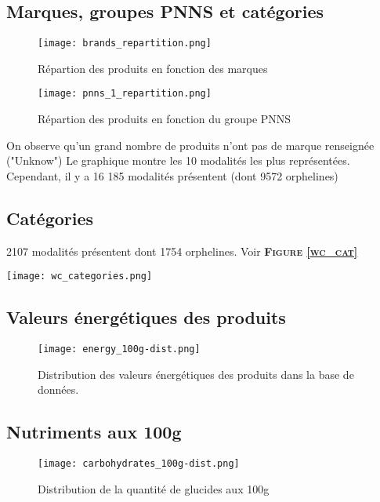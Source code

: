   \subsection{Marques, groupes PNNS et catégories}
  \begin{figure}[H]
    \texttt{[image: brands\_repartition.png]}
    \caption{Répartion des produits en fonction des marques}
    \label{}
  \end{figure}
  \begin{figure}[H]
    \texttt{[image: pnns\_1\_repartition.png]}
    \caption{Répartion des produits en fonction du groupe PNNS}
    \label{}
  \end{figure}

  On observe qu'un grand nombre de produits n'ont pas de marque renseignée ("Unknow")
  Le graphique montre les 10 modalités les plus représentées. Cependant, il y a
  16 185 modalités présentent (dont 9572 orphelines)

  \subsection{Catégories}
  2107 modalités présentent dont 1754 orphelines. Voir \textsc{\bf{Figure \ref{wc_cat}}}
  \begin{figure*}
    \texttt{[image: wc\_categories.png]}
    \caption{Les catégories présentent dans la base de données sous forme de
    nuage de mot (wordcloud)}
    \label{wc_cat}
  \end{figure*}


  \subsection{Valeurs énergétiques des produits}
  \begin{figure}[H]
    \texttt{[image: energy\_100g-dist.png]}
    \caption{Distribution des valeurs énergétiques des produits dans la base
    de données.}
    \label{}
  \end{figure}

  \subsection{Nutriments aux 100g}
  \begin{figure}[H]
    \texttt{[image: carbohydrates\_100g-dist.png]}
    \caption{Distribution de la quantité de glucides aux 100g}
    \label{}
  \end{figure}

